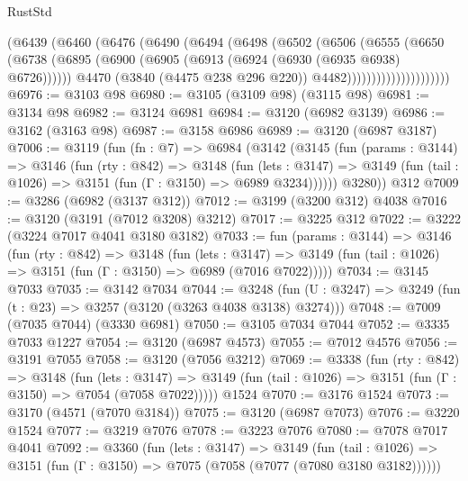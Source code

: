 \begin{lexlean}{RustStd}
\begin{coremodule}
{\begin{coremodule}
{{{{{{{{{{{{{{{{{{{{{{{{{{                        (@6439
                          (@6460
                            (@6476
                              (@6490
                                (@6494
                                  (@6498
                                    (@6502
                                      (@6506
                                        (@6555
                                          (@6650
                                            (@6738
                                              (@6895
                                                (@6900
                                                  (@6905
                                                    (@6913 (@6924 (@6930 (@6935 @6938) @6726))))))
                                              @4470
                                              (@3840 (@4475 @238 @296 @220))
                                              @4482)))))))))))))))))))))
@6976 := @3103 @98
@6980 := @3105 (@3109 @98) (@3115 @98)
@6981 := @3134 @98
@6982 := @3124 @6981
@6984 := @3120 (@6982 @3139)
@6986 := @3162 (@3163 @98)
@6987 := @3158 @6986
@6989 := @3120 (@6987 @3187)
@7006 := @3119
    (fun (fn : @7) =>
    @6984
      (@3142
        (@3145
          (fun (params : @3144) =>
          @3146
            (fun (rty : @842) =>
            @3148
              (fun (lets : @3147) =>
              @3149 (fun (tail : @1026) => @3151 (fun (Γ : @3150) => @6989 @3234))))))
        @3280))
    @312
@7009 := @3286 (@6982 (@3137 @312))
@7012 := @3199 (@3200 @312) @4038
@7016 := @3120 (@3191 (@7012 @3208) @3212)
@7017 := @3225 @312
@7022 := @3222 (@3224 @7017 @4041 @3180 @3182)
@7033 := fun (params : @3144) =>
  @3146
    (fun (rty : @842) =>
    @3148
      (fun (lets : @3147) =>
      @3149 (fun (tail : @1026) => @3151 (fun (Γ : @3150) => @6989 (@7016 @7022)))))
@7034 := @3145 @7033
@7035 := @3142 @7034
@7044 := @3248 (fun (U : @3247) => @3249 (fun (t : @23) => @3257 (@3120 (@3263 @4038 @3138) @3274)))
@7048 := @7009 (@7035 @7044) (@3330 @6981)
@7050 := @3105 @7034 @7044
@7052 := @3335 @7033 @1227
@7054 := @3120 (@6987 @4573)
@7055 := @7012 @4576
@7056 := @3191 @7055
@7058 := @3120 (@7056 @3212)
@7069 := @3338
    (fun (rty : @842) =>
    @3148
      (fun (lets : @3147) =>
      @3149 (fun (tail : @1026) => @3151 (fun (Γ : @3150) => @7054 (@7058 @7022)))))
    @1524
@7070 := @3176 @1524
@7073 := @3170 (@4571 (@7070 @3184))
@7075 := @3120 (@6987 @7073)
@7076 := @3220 @1524
@7077 := @3219 @7076
@7078 := @3223 @7076
@7080 := @7078 @7017 @4041
@7092 := @3360
    (fun (lets : @3147) =>
    @3149
      (fun (tail : @1026) => @3151 (fun (Γ : @3150) => @7075 (@7058 (@7077 (@7080 @3180 @3182))))))
}}}}}}}}}}}}}}}}}}}}}}}}}}
\end{coremodule}}
\end{coremodule}
\end{lexlean}
